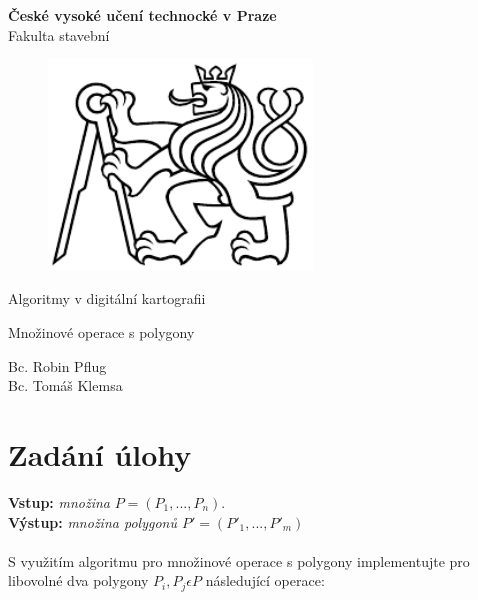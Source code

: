 \documentclass[a4paper, 12pt]{article}
\begin{document}
\begin{titlepage}
\begin{center}
\noindent
\Large \textbf{České vysoké učení technocké v Praze}\\ Fakulta stavební
\vspace{5cm}

\huge

\begin{figure}[h!]
	\centering
	\includegraphics[width=7cm]{logo.png}
\end{figure}

\vspace{0.5cm}

Algoritmy v digitální kartografii \\

\vspace{3cm}

\Huge  
Množinové operace s polygony\\

\vspace{2cm}

\Large
Bc. Robin Pflug \\
Bc. Tomáš Klemsa \\

\end{center}

\end{titlepage}




\pagestyle{plain}     %
\setcounter{page}{1}  %

\tableofcontents
\newpage

\section{Zadání úlohy}

\textbf{Vstup:} \textit{množina} $P=(P_1,...,P_n)$.\\
\textbf{Výstup:} 	\textit{množina polygonů $ P'=(P'_1,...,P'_m) $ } \\
\\
S využitím algoritmu pro množinové operace s polygony implementujte pro libovolné dva polygony $ P_i,P_j \epsilon P $ následující operace:
\end{document}

